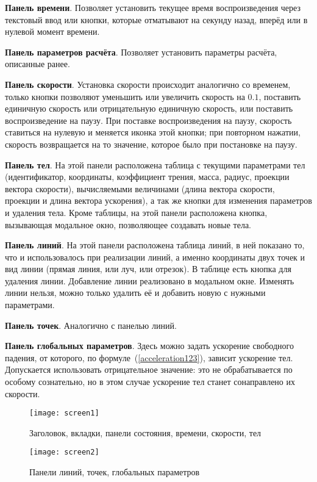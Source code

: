 \textbf{Панель времени}. Позволяет установить текущее время воспроизведения через текстовый ввод или кнопки,
которые отматывают на секунду назад, вперёд или в нулевой момент времени.

\textbf{Панель параметров расчёта}.
Позволяет установить параметры расчёта, описанные ранее.

\textbf{Панель скорости}. Установка скорости происходит аналогично со временем, только кнопки
позволяют уменьшить или увеличить скорость на \(0.1\), поставить единичную скорость или
отрицательную единичную скорость, или поставить воспроизведение на паузу.
При поставке воспроизведения на паузу, скорость ставиться на нулевую и меняется иконка этой кнопки;
при повторном нажатии, скорость возвращается на то значение, которое было при постановке на паузу.

\textbf{Панель тел}.
На этой панели расположена таблица с текущими параметрами тел
(идентификатор, координаты, коэффициент трения, масса, радиус, проекции вектора скорости),
вычисляемыми величинами (длина вектора скорости, проекции и длина вектора ускорения),
а так же кнопки для изменения параметров и удаления тела.
Кроме таблицы, на этой панели расположена кнопка, вызывающая модальное окно,
позволяющее создавать новые тела.

\textbf{Панель линий}. На этой панели расположена таблица линий, в ней
показано то, что и использовалось при реализации линий,
а именно координаты двух точек и вид линии (прямая линия, или луч, или отрезок).
В таблице есть кнопка для удаления линии. Добавление линии реализовано в модальном окне.
Изменять линии нельзя, можно только удалить её и добавить новую с нужными параметрами.

\textbf{Панель точек}. Аналогично с панелью линий.

\textbf{Панель глобальных параметров}. Здесь можно задать ускорение
свободного падения, от которого, по формуле~(\ref{acceleration123}), зависит ускорение тел.
Допускается использовать отрицательное значение: это не обрабатывается по особому сознательно,
но в этом случае ускорение тел станет сонаправлено их скорости.

\begin{figure}[H]
    \centering
    \texttt{[image: screen1]}
    \caption{Заголовок, вкладки, панели состояния, времени, скорости, тел\label{screen1fig}}
\end{figure}

\begin{figure}[H]
    \centering
    \texttt{[image: screen2]}
    \caption{Панели линий, точек, глобальных параметров\label{screen2fig}}
\end{figure}

